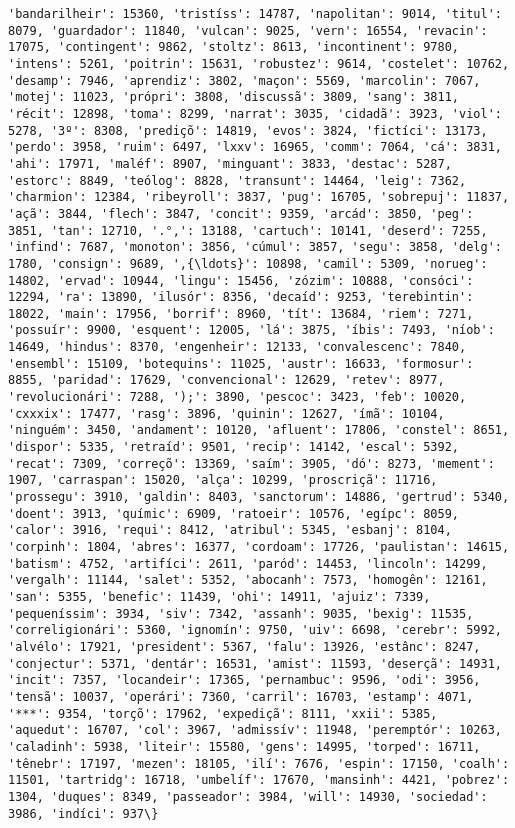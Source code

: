 \documentclass[11pt]{article}
\begin{document}
\begin{Verbatim}[commandchars=\\\{\}]
'bandarilheir': 15360, 'tristíss': 14787, 'napolitan': 9014, 'titul': 8079, 'guardador': 11840, 'vulcan': 9025, 'vern': 16554, 'revacin': 17075, 'contingent': 9862, 'stoltz': 8613, 'incontinent': 9780, 'intens': 5261, 'poitrin': 15631, 'robustez': 9614, 'costelet': 10762, 'desamp': 7946, 'aprendiz': 3802, 'maçon': 5569, 'marcolin': 7067, 'motej': 11023, 'própri': 3808, 'discussã': 3809, 'sang': 3811, 'récit': 12898, 'toma': 8299, 'narrat': 3035, 'cidadã': 3923, 'viol': 5278, '3º': 8308, 'prediçõ': 14819, 'evos': 3824, 'fictíci': 13173, 'perdo': 3958, 'ruim': 6497, 'lxxv': 16965, 'comm': 7064, 'cá': 3831, 'ahi': 17971, 'maléf': 8907, 'minguant': 3833, 'destac': 5287, 'estorc': 8849, 'teólog': 8828, 'transunt': 14464, 'leig': 7362, 'charmion': 12384, 'ribeyroll': 3837, 'pug': 16705, 'sobrepuj': 11837, 'açã': 3844, 'flech': 3847, 'concit': 9359, 'arcád': 3850, 'peg': 3851, 'tan': 12710, '.°,': 13188, 'cartuch': 10141, 'deserd': 7255, 'infind': 7687, 'monoton': 3856, 'cúmul': 3857, 'segu': 3858, 'delg': 1780, 'consign': 9689, ',{\ldots}': 10898, 'camil': 5309, 'norueg': 14802, 'ervad': 10944, 'lingu': 15456, 'zózim': 10888, 'consóci': 12294, 'ra': 13890, 'ilusór': 8356, 'decaíd': 9253, 'terebintin': 18022, 'main': 17956, 'borrif': 8960, 'tít': 13684, 'riem': 7271, 'possuír': 9900, 'esquent': 12005, 'lá': 3875, 'íbis': 7493, 'níob': 14649, 'hindus': 8370, 'engenheir': 12133, 'convalescenc': 7840, 'ensembl': 15109, 'botequins': 11025, 'austr': 16633, 'formosur': 8855, 'paridad': 17629, 'convencional': 12629, 'retev': 8977, 'revolucionári': 7288, ');': 3890, 'pescoc': 3423, 'feb': 10020, 'cxxxix': 17477, 'rasg': 3896, 'quinin': 12627, 'ímã': 10104, 'ninguém': 3450, 'andament': 10120, 'afluent': 17806, 'constel': 8651, 'dispor': 5335, 'retraíd': 9501, 'recip': 14142, 'escal': 5392, 'recat': 7309, 'correçõ': 13369, 'saím': 3905, 'dó': 8273, 'mement': 1907, 'carraspan': 15020, 'alça': 10299, 'proscriçã': 11716, 'prossegu': 3910, 'galdin': 8403, 'sanctorum': 14886, 'gertrud': 5340, 'doent': 3913, 'químic': 6909, 'ratoeir': 10576, 'egípc': 8059, 'calor': 3916, 'requi': 8412, 'atribul': 5345, 'esbanj': 8104, 'corpinh': 1804, 'abres': 16377, 'cordoam': 17726, 'paulistan': 14615, 'batism': 4752, 'artifíci': 2611, 'paród': 14453, 'lincoln': 14299, 'vergalh': 11144, 'salet': 5352, 'abocanh': 7573, 'homogên': 12161, 'san': 5355, 'benefic': 11439, 'ohi': 14911, 'ajuiz': 7339, 'pequeníssim': 3934, 'siv': 7342, 'assanh': 9035, 'bexig': 11535, 'correligionári': 5360, 'ignomín': 9750, 'uiv': 6698, 'cerebr': 5992, 'alvélo': 17921, 'president': 5367, 'falu': 13926, 'estânc': 8247, 'conjectur': 5371, 'dentár': 16531, 'amist': 11593, 'deserçã': 14931, 'incit': 7357, 'locandeir': 17365, 'pernambuc': 9596, 'odi': 3956, 'tensã': 10037, 'operári': 7360, 'carril': 16703, 'estamp': 4071, '***': 9354, 'torçõ': 17962, 'expediçã': 8111, 'xxii': 5385, 'aquedut': 16707, 'col': 3967, 'admissív': 11948, 'peremptór': 10263, 'caladinh': 5938, 'liteir': 15580, 'gens': 14995, 'torped': 16711, 'tênebr': 17197, 'mezen': 18105, 'ilí': 7676, 'espin': 17150, 'coalh': 11501, 'tartridg': 16718, 'umbelíf': 17670, 'mansinh': 4421, 'pobrez': 1304, 'duques': 8349, 'passeador': 3984, 'will': 14930, 'sociedad': 3986, 'indíci': 937\}


\end{Verbatim}
\end{document}
